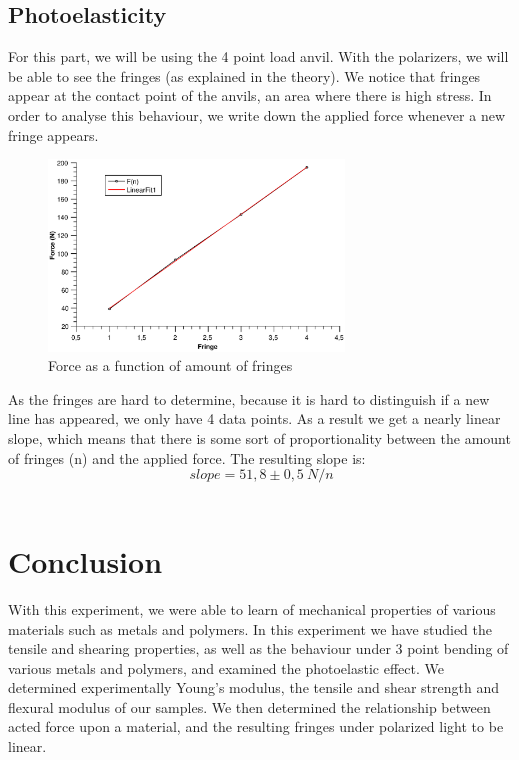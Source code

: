 \documentclass{scrartcl}
\begin{document}
\subsection{Photoelasticity}
For this part, we will be using the 4 point load anvil. With the polarizers, we will be able to see the fringes (as explained in the theory). We notice that fringes appear at the contact point of the anvils, an area where there is high stress. In order to analyse this behaviour, we write down the applied force whenever a new fringe appears. 
\begin{figure}[h]
    \centering
    \includegraphics[width=0.7\textwidth]{Photoelasticity/fringes.eps}
    \caption{Force as a function of amount of fringes}
    \label{fig:photoelasticity}
\end{figure}
As the fringes are hard to determine, because it is hard to distinguish if a new line has appeared, we only have 4 data points. As a result we get a nearly linear slope, which means that there is some sort of proportionality between the amount of fringes (n) and the applied force.
The resulting slope is:
\[\ slope =  51,8 \pm 0,5  \ N/n \]\

\section{Conclusion}
With this experiment, we were able to learn of mechanical properties of various materials such as metals and polymers. In this experiment we have studied the tensile and shearing properties, as well as the behaviour under 3 point bending of various metals and polymers, and examined the photoelastic effect. We determined experimentally Young's modulus, the tensile and shear strength and flexural modulus of our samples. We then determined the relationship between acted force upon a material, and the resulting fringes under polarized light to be linear.


\printbibliography
\end{document}
